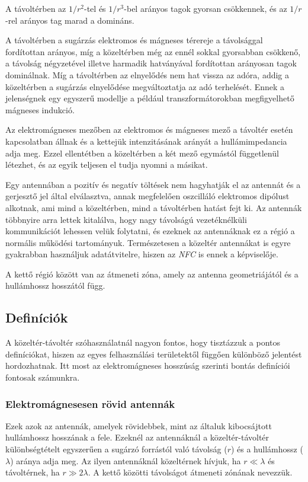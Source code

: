 \documentclass[12pt]{article}
\begin{document}
A távoltérben az ${1}/{r^2}$-tel és ${1}/{r^3}$-bel arányos tagok
gyorsan csökkennek, és az ${1}/{r}$-rel arányos tag marad a domináns.

A távoltérben a sugárzás elektromos és mágneses térereje a 
távolsággal fordítottan arányos, 
míg a közeltérben még az ennél sokkal gyorsabban csökkenő, a távolság négyzetével illetve 
harmadik hatványával fordítottan arányosan tagok dominálnak.
Míg a távoltérben az elnyelődés nem hat vissza az adóra, addig a közeltérben a sugárzás
elnyelődése megváltoztatja az adó terhelését. Ennek a jelenségnek egy egyszerű
modellje a például transzformátorokban megfigyelhető mágneses indukció.

Az elektromágneses mezőben az elektromos és mágneses mező a távoltér esetén kapcsolatban
állnak és a kettejük intenzitásának arányát a hullámimpedancia adja meg. 
Ezzel ellentétben a közeltérben a két mező egymástól függetlenül létezhet, és
az egyik teljesen el tudja nyomni a másikat.

Egy antennában a pozitív és negatív töltések nem hagyhatják el az antennát és a 
gerjesztő jel által elválasztva, annak megfelelően oszcilláló elektromos dipólust
alkotnak, ami mind a közeltérben, mind a távoltérben hatást fejt ki. Az antennák
többnyire arra lettek kitalálva, hogy nagy távolságú vezetéknélküli kommunikációt
lehessen velük folytatni, és ezeknek az antennáknak ez a régió a normális működési
tartományuk. Természetesen a közeltér antennákat is egyre gyakrabban használjuk
adatátvitelre, hiszen az \emph{NFC} is ennek a képviselője.

A kettő régió között van az átmeneti zóna, amely az antenna geometriájától és a 
hullámhossz hosszától függ.

\subsection{Definíciók}
A közeltér-távoltér szóhasználatnál nagyon fontos, hogy tisztázzuk a pontos
definíciókat, hiszen az egyes felhasználási területektől függően különböző
jelentést hordozhatnak. Itt most az elektromágneses hosszúság szerinti bontás
definíciói fontosak számunkra.

\subsubsection{Elektromágnesesen rövid antennák}
Ezek azok az antennák, amelyek rövidebbek, mint az általuk kibocsájtott hullámhossz
hosszának a fele. Ezeknél az antennáknál a közeltér-távoltér különbségtételt egyszerűen
a sugárzó forrástól való távolság ($r$) és a hullámhossz ($\lambda$) aránya adja meg.
Az ilyen antennáknál közeltérnek hívjuk, ha $ r \ll \lambda $ és távoltérnek, ha $ r \gg 2\lambda $.
A kettő közötti távolságot átmeneti zónának nevezzük.
\end{document}
